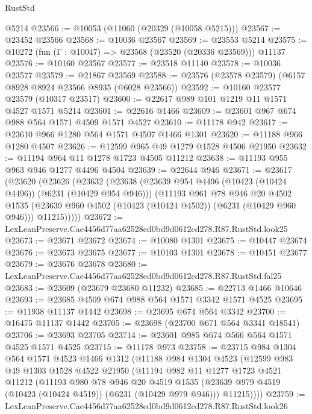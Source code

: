 \begin{lexlean}{RustStd}
\begin{coremodule}
{{    @5214
@23566 := @10053 (@11060 (@20329 (@10058 @5215)))
@23567 := @23452 @23566
@23568 := @10036 @23567
@23569 := @23553 @5214
@23575 := @10272 (fun (Γ : @10047) => @23568 (@23520 (@20336 @23569))) @11137
@23576 := @10160 @23567
@23577 := @23518 @11140
@23578 := @10036 @23577
@23579 := @21867 @23569
@23588 := @23576 (@23578 @23579) (@6157 @8928 @8924 @23566 @8935 (@6028 @23566))
@23592 := @10160 @23577 @23579 (@10317 @23517)
@23600 := @22617 @989 @101 @1219 @11 @1571 @4527 @1571 @5214
@23601 := @22616 @1466
@23609 := @23601 @967 @674 @988 @564 @1571 @4509 @1571 @4527
@23610 := @11178 @942
@23617 := @23610 @966 @1280 @564 @1571 @4507 @1466 @1301
@23620 := @11188 @966 @1280 @4507
@23626 := @12599 @965 @49 @1279 @1528 @4506 @21950
@23632 := @11194 @964 @11 @1278 @1723 @4505 @11212
@23638 := @11193 @955 @963 @946 @1277 @4496 @4504
@23639 := @22644 @946
@23671 := @23617
    (@23620
      (@23626
        (@23632
          (@23638
            (@23639 @954 @4496 (@10423 (@10424 @4496)) (@6231 (@10429 @954 @946)))
            (@11193
              @961
              @78
              @946
              @20
              @4502
              @1535
              (@23639 @960 @4502 (@10423 (@10424 @4502)) (@6231 (@10429 @960 @946)))
              @11215)))))
@23672 := LexLeanPreserve.Cae4456d77aa62528ed0bd9d0612cd278.R87.RustStd.look25
@23673 := @23671 @23672
@23674 := @10080 @1301
@23675 := @10447 @23674
@23676 := @23673 @23675
@23677 := @10103 @1301
@23678 := @10451 @23677
@23679 := @23676 @23678
@23680 := LexLeanPreserve.Cae4456d77aa62528ed0bd9d0612cd278.R87.RustStd.fal25
@23683 := @23609 (@23679 @23680 @11232)
@23685 := @22713 @1466 @10646
@23693 := @23685 @4509 @674 @988 @564 @1571 @3342 @1571 @4525
@23695 := @11938 @11137 @1442
@23698 := @23695 @674 @564 @3342
@23700 := @16475 @11137 @1442
@23705 := @23698 (@23700 @671 @564 @3341 @18541)
@23706 := @23693 @23705
@23714 := @23601 @985 @674 @566 @564 @1571 @4525 @1571 @4525
@23715 := @11178 @973
@23758 := @23715
    @984
    @1304
    @564
    @1571
    @4523
    @1466
    @1312
    (@11188
      @984
      @1304
      @4523
      (@12599
        @983
        @49
        @1303
        @1528
        @4522
        @21950
        (@11194
          @982
          @11
          @1277
          @1723
          @4521
          @11212
          (@11193
            @980
            @78
            @946
            @20
            @4519
            @1535
            (@23639 @979 @4519 (@10423 (@10424 @4519)) (@6231 (@10429 @979 @946)))
            @11215))))
@23759 := LexLeanPreserve.Cae4456d77aa62528ed0bd9d0612cd278.R87.RustStd.look26
}}
\end{coremodule}
\end{lexlean}
